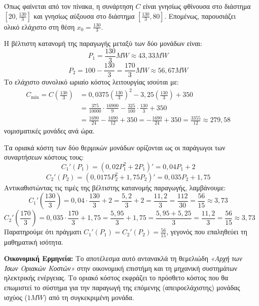 \begin{alist}
\begin{center}
\end{center}

Όπως φαίνεται από τον πίνακα, η συνάρτηση $C$ είναι γνησίως φθίνουσα στο διάστημα $\left[20, \frac{130}{3}\right]$ και γνησίως αύξουσα στο διάστημα $\left[\frac{130}{3}, 80\right]$. Επομένως, παρουσιάζει ολικό ελάχιστο στη θέση $x_0 = \frac{130}{3}$.

Η βέλτιστη κατανομή της παραγωγής μεταξύ των δύο μονάδων είναι:
\[P_1 = \frac{130}{3}\si{MW} \approx 43{,}33\si{MW}\]
\[P_2 = 100 - \frac{130}{3} = \frac{170}{3}\si{MW} \approx 56{,}67\si{MW}\]
Το ελάχιστο συνολικό ωριαίο κόστος λειτουργίας ισούται με:
\begin{align*}
  C_{\min} = C\left(\frac{130}{3}\right) &= 0{,}0375\left(\frac{130}{3}\right)^2 - 3{,}25\left(\frac{130}{3}\right) + 350 \\
  &= \frac{375}{10000} \cdot \frac{16900}{9} - \frac{325}{100} \cdot \frac{130}{3} + 350 \\
  &= \frac{1690}{24} - \frac{1690}{12} + 350 = -\frac{1690}{24} + 350 = \frac{3355}{12} \approx 279{,}58
\end{align*}
νομισματικές μονάδες ανά ώρα.

\item Τα οριακά κόστη των δύο θερμικών μονάδων ορίζονται ως οι παράγωγοι των συναρτήσεων κόστους τους:
\[C_1'(P_1) = (0{,}02P_1^2 + 2P_1)' = 0{,}04P_1 + 2\]
\[C_2'(P_2) = (0{,}0175P_2^2 + 1{,}75P_2)' = 0{,}035P_2 + 1{,}75\]
Αντικαθιστώντας τις τιμές της βέλτιστης κατανομής παραγωγής, λαμβάνουμε:
\[C_1'\left(\frac{130}{3}\right) = 0{,}04 \cdot \frac{130}{3} + 2 = \frac{5{,}2}{3} + 2 = \frac{11{,}2}{3} = \frac{112}{30} = \frac{56}{15} \approx 3{,}73\]
\[C_2'\left(\frac{170}{3}\right) = 0{,}035 \cdot \frac{170}{3} + 1{,}75 = \frac{5{,}95}{3} + 1{,}75 = \frac{5{,}95 + 5{,}25}{3} = \frac{11{,}2}{3} = \frac{56}{15} \approx 3{,}73\]
Παρατηρούμε ότι πράγματι $C_1'(P_1) = C_2'(P_2) = \frac{56}{15}$, γεγονός που επαληθεύει τη μαθηματική ισότητα.

\textbf{Οικονομική Ερμηνεία:} 
Το αποτέλεσμα αυτό αντανακλά τη θεμελιώδη \emph{«Αρχή των Ίσων Οριακών Κοστών»} στην οικονομική επιστήμη και τη μηχανική συστημάτων ηλεκτρικής ενέργειας. Το οριακό κόστος εκφράζει το πρόσθετο κόστος που θα επωμιστεί το σύστημα για την παραγωγή της επόμενης (απειροελάχιστης) μονάδας ισχύος ($1\si{MW}$) από τη συγκεκριμένη μονάδα. 


\end{alist}
